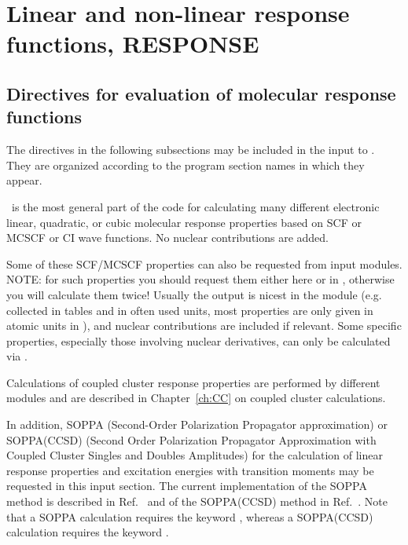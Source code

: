 \chapter{Linear and non-linear response functions, RESPONSE}
\label{ch:response}

\section{Directives for evaluation of molecular response functions}\label{sec:rspinp}

The directives in the following subsections may be included in the input to \resp.
They are organized according to the program section names in which they
appear.

\resp\ is the most general part of the code for calculating 
many different electronic linear, quadratic, or cubic molecular
response properties based on SCF or MCSCF or CI wave functions.
No nuclear contributions are added.

Some of these SCF/MCSCF properties can also be requested
from  input modules.
NOTE: for such properties you should request them either here or
in , otherwise you will calculate them twice!
Usually the output is nicest in
the  module (e.g. collected in tables and in
often used units, most properties are only given in atomic
units in \resp), and nuclear contributions are included if relevant.
Some specific properties, especially those involving nuclear derivatives,
can only be calculated via .

Calculations of coupled cluster response properties are performed
by different modules and are described
in Chapter~\ref{ch:CC} on coupled cluster calculations.

In addition, SOPPA
(Second-Order Polarization Propagator 
approximation) or SOPPA(CCSD) (Second Order Polarization
Propagator Approximation with Coupled Cluster Singles and Doubles Amplitudes) 
for the calculation of linear response
properties and excitation energies with transition moments
may be requested in this input section. The current
implementation of the SOPPA method is described 
in Ref.~\cite{mjpekdtehjajjojcp} and of the SOPPA(CCSD) method in 
Ref.~\cite{soppaccsd}. Note that a SOPPA calculation
requires the keyword , whereas a SOPPA(CCSD) calculation requires
the keyword .


